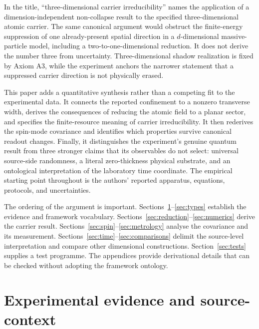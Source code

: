 \documentclass[11pt,a4paper]{article}
\theoremstyle{definition}
\theoremstyle{remark}
\begin{document}
In the title, ``three-dimensional carrier irreducibility'' names the application of a dimension-independent non-collapse result to the specified three-dimensional atomic carrier. The same canonical argument would obstruct the finite-energy suppression of one already-present spatial direction in a $d$-dimensional massive-particle model, including a two-to-one-dimensional reduction. It does not derive the number three from uncertainty. Three-dimensional shadow realization is fixed by Axiom A3, while the experiment anchors the narrower statement that a suppressed carrier direction is not physically erased.\cite{foundation}

This paper adds a quantitative synthesis rather than a competing fit to the experimental data. It connects the reported confinement to a nonzero transverse width, derives the consequences of reducing the atomic field to a planar sector, and specifies the finite-resource meaning of carrier irreducibility. It then rederives the spin-mode covariance and identifies which properties survive canonical readout changes. Finally, it distinguishes the experiment's genuine quantum result from three stronger claims that its observables do not select: universal source-side randomness, a literal zero-thickness physical substrate, and an ontological interpretation of the laboratory time coordinate. The empirical starting point throughout is the authors' reported apparatus, equations, protocols, and uncertainties.\cite{zhang2026}

The ordering of the argument is important. Sections~\ref{sec:evidence}--\ref{sec:types} establish the evidence and framework vocabulary. Sections~\ref{sec:reduction}--\ref{sec:numerics} derive the carrier result. Sections~\ref{sec:spin}--\ref{sec:metrology} analyse the covariance and its measurement. Sections~\ref{sec:time}--\ref{sec:comparisons} delimit the source-level interpretation and compare other dimensional constructions. Section~\ref{sec:tests} supplies a test programme. The appendices provide derivational details that can be checked without adopting the framework ontology.

\section{Experimental evidence and source-context}
\label{sec:evidence}
\end{document}
